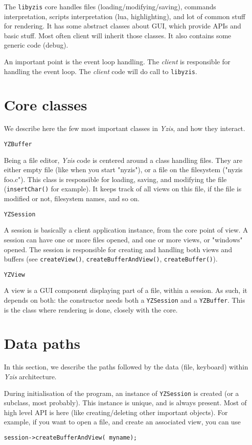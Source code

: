 \documentclass[a4paper,12pt]{report}
\begin{document}
The \verb+libyzis+ core handles files (loading/modifying/saving), commands
interpretation, scripts interpretation (lua, highlighting), and lot of
common stuff for rendering.
It has some abstract classes about GUI, which provide APIs and basic stuff.
Most often client will inherit those classes.
It also contains some generic code (debug).

An important point is the event loop handling. The \emph{client} is
responsible for handling the event loop. The \emph{client} code will do
call to \verb+libyzis+.

\section{Core classes}

We describe here the few most important classes in \emph{Yzis}, and how
they interact.

\verb+YZBuffer+

Being a file editor, \emph{Yzis} code is centered around a class handling
files. They are either empty file (like when you start "nyzis"), or a file on
the filesystem ("nyzis foo.c").
This class is responsible for loading, saving, and modifying the file
(\verb+insertChar()+ for example). It keeps track of all views on this file,
if the file is modified or not, filesystem names, and so on.

\verb+YZSession+

A session is basically a client application instance, from the core point
of view. A session can have one or more files opened, and one or more views,
or "windows" opened. The session is responsible for creating and handling
both views and buffers (see \verb+createView()+, \verb+createBufferAndView()+,
\verb+createBuffer()+).

\verb+YZView+

A view is a GUI component displaying part of a file, within a session. As
such, it depends on both: the constructor needs both a
\verb+YZSession+ and a \verb+YZBuffer+. This is the class where rendering is
done, closely with the core.

\section{Data paths}
In this section, we describe the paths followed by the data (file,
keyboard) within \emph{Yzis} architecture.

During initialisation of the program, an instance of \verb+YZSession+ is
created (or a subclass, most probably). This instance is unique, and is
always present. Most of high level API is here (like creating/deleting other
important objects).
For example, if you want to open a file, and create an associated view, you
can use
\begin{verbatim}
session->createBufferAndView( myname);
\end{verbatim}
\end{document}
